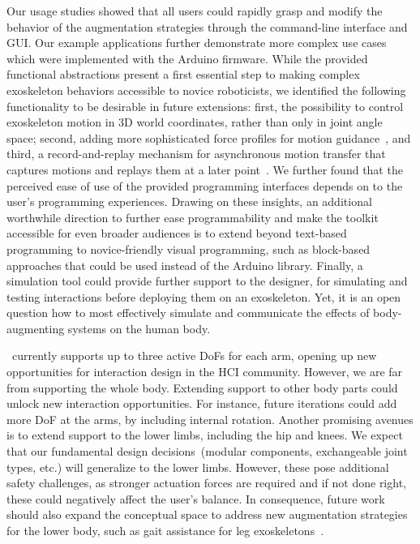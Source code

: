 Our usage studies showed that all users could rapidly grasp and modify the behavior of the augmentation strategies through the command-line interface and GUI.
Our example applications further demonstrate more complex use cases which were implemented with the Arduino firmware.
While the provided functional abstractions present a first essential step to making complex exoskeleton behaviors accessible to novice roboticists, we identified the following functionality to be desirable in future extensions: first, the possibility to control exoskeleton motion in 3D world coordinates, rather than only in joint angle space; second, adding more sophisticated force profiles for motion guidance~\cite{proietti_2016,gasperina_2021}, and third, a record-and-replay mechanism for asynchronous motion transfer that captures motions and replays them at a later point~\cite{proietti_2016,gasperina_2021}. 
We further found that the perceived ease of use of the provided programming interfaces depends on to the user's programming experiences. Drawing on these insights, an additional worthwhile direction to further ease programmability and make the toolkit accessible for even broader audiences is to extend beyond text-based programming to novice-friendly visual programming, such as block-based approaches that could be used instead of the Arduino library.
Finally, a simulation tool could provide further support to the designer, for simulating and testing interactions before deploying them on an exoskeleton. Yet, it is an open question how to most effectively simulate and communicate the effects of body-augmenting systems on the human body.

\toolkit~currently supports up to three active DoFs for each arm, opening up new opportunities for interaction design in the HCI community. However, we are far from supporting the whole body. Extending support to other body parts could unlock new interaction opportunities. For instance, future iterations could add more DoF at the arms, by including internal rotation. Another promising avenues is to extend support to the lower limbs, including the hip and knees. We expect that our fundamental design decisions~(modular components, exchangeable joint types, etc.) will generalize to the lower limbs. However, these pose additional safety challenges, as stronger actuation forces are required and if not done right, these could negatively affect the user's balance. In consequence, future work should also expand the conceptual space to address new augmentation strategies for the lower body, such as gait assistance for leg exoskeletons~\cite{baud_2021}. 


